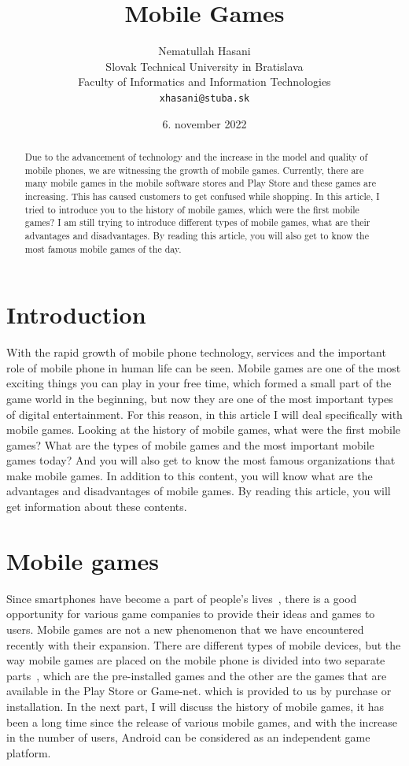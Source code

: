 \documentclass[10pt,a4paper]{article}
\title{Mobile Games} %
\author{Nematullah Hasani\\[1pt]
	{\small Slovak Technical University in Bratislava}\\
	{\small Faculty of Informatics and Information Technologies}\\
	{\small \texttt{xhasani@stuba.sk}}
	}
\date{\small 6. november 2022} %
\begin{document}
\maketitle

\begin{abstract}

Due to the advancement of technology and the increase in the model and quality of mobile phones, we are witnessing the growth of mobile games. Currently, there are many mobile games in the mobile software stores and Play Store and these games are increasing. This has caused customers to get confused while shopping. In this article, I tried to introduce you to the history of mobile games, which were the first mobile games? I am still trying to introduce different types of mobile games, what are their advantages and disadvantages. By reading this article, you will also get to know the most famous mobile games of the day.
\end{abstract}



\section{Introduction}

With the rapid growth of mobile phone technology, services and the important role of mobile phone in human life can be seen. Mobile games are one of the most exciting things you can play in your free time, which formed a small part of the game world in the beginning, but now they are one of the most important types of digital entertainment. For this reason, in this article I will deal specifically with mobile games. Looking at the history of mobile games, what were the first mobile games? What are the types of mobile games and the most important mobile games today? And you will also get to know the most famous organizations that make mobile games. In addition to this content, you will know what are the advantages and disadvantages of mobile games. By reading this article, you will get information about these contents.

\section{Mobile games}%
Since smartphones have become a part of people's lives~\cite{liang2011effect}, there is a good opportunity for various game companies to provide their ideas and games to users. Mobile games are not a new phenomenon that we have encountered recently with their expansion. There are different types of mobile devices, but the way mobile games are placed on the mobile phone is divided into two separate parts~\cite{mayra2015mobile}, which are the pre-installed games and the other are the games that are available in the Play Store or Game-net. which is provided to us by purchase or installation. In the next part, I will discuss the history of mobile games, it has been a long time since the release of various mobile games, and with the increase in the number of users, Android can be considered as an independent game platform.
\end{document}
